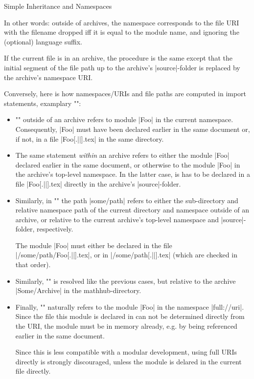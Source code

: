 \begin{sfragment}{Simple Inheritance and Namespaces}
\begin{dangerbox}
   In other words: outside of archives, the namespace corresponds to
   the file URI with the filename dropped iff it is equal to the
   module name, and ignoring the (optional) language suffix.

   If the current file is in an archive, the procedure is the same
   except that the initial segment of the file path up to the archive's
   |source|-folder is replaced by the archive's namespace URI.
\end{dangerbox}

\begin{dangerbox}
        Conversely, here is how namespaces/URIs and file paths are computed
 in import statements, examplary \stexcode"\importmodule":

 \begin{itemize}
   \item \stexcode"" outside of an archive refers 
     to module |Foo| in the current namespace. Consequently, |Foo|
     must have been declared earlier in the same document or, if not,
     in a file |Foo[.||].tex| in the same directory.
   \item The same statement \emph{within} an archive refers to either
     the module |Foo| declared earlier in the same document, or
     otherwise to the module |Foo| in the archive's top-level namespace.
     In the latter case, is has to be declared in a file |Foo[.||].tex|
     directly in the archive's |source|-folder.
   \item Similarly, in \stexcode"" the path
     |some/path| refers to either the sub-directory and relative 
     namespace path of the current directory and namespace outside of an archive,
     or relative to the current archive's top-level namespace and |source|-folder,
     respectively.

     The module |Foo| must either be declared in the file
     |/some/path/Foo[.||].tex|, or in
     |/some/path[.||].tex| (which are
     checked in that order).
   \item Similarly, \stexcode""
     is resolved like the previous cases, but relative to the archive
     |Some/Archive| in the mathhub-directory.
   \item Finally, \stexcode"" naturally refers to the
     module |Foo| in the namespace |full://uri|. Since the file this module
     is declared in can not be determined directly from the URI, the module
     must be in memory already, e.g. by being referenced earlier in the
     same document.

     Since this is less compatible with a modular development, using full
     URIs directly is strongly discouraged, unless the module is delared in
     the current file directly.
 \end{itemize} 

    \end{dangerbox}

\end{sfragment}